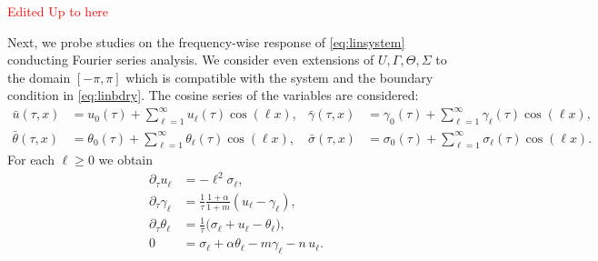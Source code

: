 \documentclass[a4paper,11pt]{article}
\def\l{{\ell}}
\newcommand{\tcr}{\textcolor{red}}
\theoremstyle{remark}
\begin{document}
\tcr{Edited Up to here}


Next, we probe studies on the frequency-wise response of \eqref{eq:linsystem} conducting Fourier series analysis. We consider even extensions of $U,\Gamma,\Theta,\Sigma$ to the domain $[-\pi,\pi]$ which is compatible with the system and the boundary condition in \eqref{eq:linbdry}. The cosine series of the variables are considered:
\begin{align*}
 \bar u(\tau,x) &= u_0(\tau) + \sum_{\ell=1}^\infty  u_\ell(\tau)\cos(\l x), &
\bar \gamma(\tau,x) &= \gamma_0(\tau) + \sum_{\ell=1}^\infty \gamma_\ell(\tau)\cos(\l x),\\
\bar \theta(\tau,x) &= \theta_0(\tau) + \sum_{\ell=1}^\infty \theta_\ell(\tau)\cos(\l x), &
 \bar\sigma(\tau,x) &= \sigma_0(\tau) + \sum_{\ell=1}^\infty \sigma_\ell(\tau)\cos(\l x).
\end{align*}
For each $\ell\ge0$ we obtain
\begin{equation} \label{eq:l-system}
 \begin{aligned}
  \partial_\tau u_\ell &= -\l^2 \sigma_\ell,\\
  \partial_\tau\gamma_\ell &= \frac{1}{\tau}\frac{1+\alpha}{1+m}(u_\ell-\gamma_\ell),\\
  \partial_\tau\theta_\ell &= \frac{1}{\tau}\Big(\sigma_\ell+ u_\ell -\theta_\ell\Big),\\%
  0&=\sigma_\ell + \alpha\theta_\ell -m\gamma_\ell - n \, u_\ell .
 \end{aligned}
\end{equation}
\end{document}
